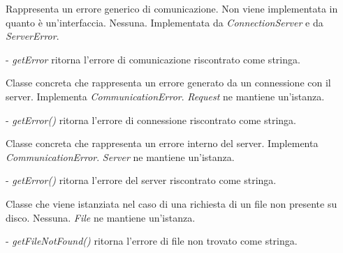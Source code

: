 Rappresenta un errore generico di comunicazione. Non viene implementata in quanto \`e un'interfaccia. 
Nessuna.
Implementata da \textit{ConnectionServer} e da \textit{ServerError}.
\begin{elencopuntato}[\subsubsecindent]
\item[-] \textit{getError} ritorna l'errore di comunicazione riscontrato come stringa.
\end{elencopuntato}


Classe concreta che rappresenta un errore generato da un connessione con il server.
Implementa \textit{CommunicationError}.
\textit{Request} ne mantiene un'istanza.
\begin{elencopuntato}[\subsubsecindent]
\item[-] \textit{getError()} ritorna l'errore di connessione riscontrato come stringa.
\end{elencopuntato}

Classe concreta che rappresenta un errore interno del server.
Implementa \textit{CommunicationError}.
\textit{Server} ne mantiene un'istanza.
\begin{elencopuntato}[\subsubsecindent]
\item[-] \textit{getError()} ritorna l'errore del server riscontrato come stringa.
\end{elencopuntato}


Classe che viene istanziata nel caso di una richiesta di un file non presente su disco.
Nessuna.
\textit{File} ne mantiene un'istanza.
\begin{elencopuntato}[\subsubsecindent]
\item[-] \textit{getFileNotFound()} ritorna l'errore di file non trovato come stringa.
\end{elencopuntato}


